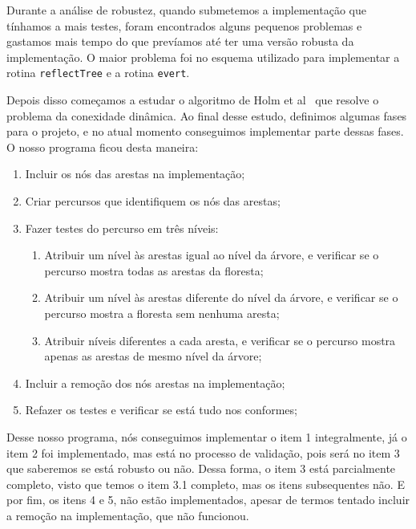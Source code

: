 Durante a análise de robustez, quando submetemos a implementação que tínhamos a mais testes, foram encontrados alguns pequenos problemas e gastamos mais tempo do que prevíamos até ter uma versão robusta da implementação. O maior problema foi no esquema utilizado para implementar a rotina \texttt{reflectTree} e a rotina \texttt{evert}. 

Depois disso começamos a estudar o algoritmo de Holm et al~\cite{HolmLT2001} que resolve o problema da conexidade dinâmica. Ao final desse estudo, definimos algumas fases para o projeto, e no atual momento conseguimos implementar parte dessas fases. O nosso programa ficou desta maneira:
\begin{enumerate}[label*=\arabic*.]
    \item Incluir os nós das arestas na implementação;
    \item Criar percursos que identifiquem os nós das arestas; 
    \item Fazer testes do percurso em três níveis: 
    \begin{enumerate}[label*=\arabic*.]
        \item Atribuir um nível às arestas igual ao nível da árvore, e verificar se o percurso mostra todas as arestas da floresta;
        \item Atribuir um nível às arestas diferente do nível da árvore, e verificar se o percurso mostra a floresta sem nenhuma aresta;
        \item Atribuir níveis diferentes a cada aresta, e verificar se o percurso mostra apenas as arestas de mesmo nível da árvore;
    \end{enumerate}
    \item Incluir a remoção dos nós arestas na implementação; 
    \item Refazer os testes e verificar se está tudo nos conformes;
\end{enumerate}

Desse nosso programa, nós conseguimos implementar o item 1 integralmente, já o item 2 foi implementado, mas está no processo de validação, pois será no item 3 que saberemos se está robusto ou não. Dessa forma, o item 3 está parcialmente completo, visto que temos o item 3.1 completo, mas os itens subsequentes não. E por fim, os itens 4 e 5, não estão implementados, apesar de termos tentado incluir a remoção na implementação, que não funcionou.
